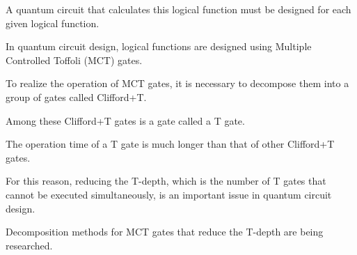 A quantum circuit that calculates this logical function must be designed for each given logical function.

In quantum circuit design, logical functions are designed using Multiple Controlled Toffoli (MCT) gates\cite{barenco1995elementary}.

To realize the operation of MCT gates, it is necessary to decompose them into a group of gates called Clifford+T.

Among these Clifford+T gates is a gate called a T gate.

The operation time of a T gate is much longer than that of other Clifford+T gates.

For this reason, reducing the T-depth, which is the number of T gates that cannot be executed simultaneously, is an important issue in quantum circuit design.

Decomposition methods for MCT gates that reduce the T-depth are being researched.

